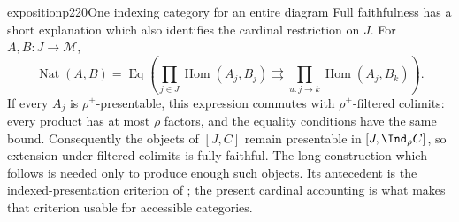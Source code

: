\begin{dcomment}{exposition}{p220}{One indexing category for an entire diagram}
Full faithfulness has a short explanation which also identifies the cardinal restriction on $J$.  For $A,B:J\to\mathcal M$,
\[
 \operatorname{Nat}(A,B)=
 \operatorname{Eq}\left(
 \prod_{j\in J}\operatorname{Hom}(A_j,B_j)
 \rightrightarrows
 \prod_{u:j\to k}\operatorname{Hom}(A_j,B_k)
 \right).
\]
If every $A_j$ is $\rho^+$-presentable, this expression commutes with $\rho^+$-filtered colimits: every product has at most $\rho$ factors, and the equality conditions have the same bound.  Consequently the objects of $[J,C]$ remain presentable in $[J,\Ind_\rho C]$, so extension under filtered colimits is fully faithful.  The long construction which follows is needed only to produce enough such objects.  Its antecedent is the indexed-presentation criterion of \citet[I, 8.8.2--8.8.3]{SGA4I1972}; the present cardinal accounting is what makes that criterion usable for accessible categories.
\end{dcomment}


